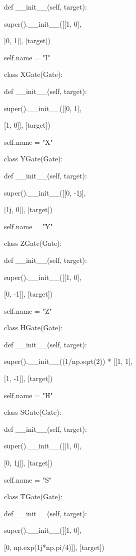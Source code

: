\documentclass[%
oneside,                 %
final,                   %
10pt]{article}
\begin{document}
    def __init__(self, target):

        super().__init__([[1, 0],

                          [0, 1]], [target])

        self.name = "I"



class XGate(Gate):

    def __init__(self, target):

        super().__init__([[0, 1],

                          [1, 0]], [target])

        self.name = "X"



class YGate(Gate):

    def __init__(self, target):

        super().__init__([[0, -1j],

                          [1j, 0]], [target])

        self.name = "Y"



class ZGate(Gate):

    def __init__(self, target):

        super().__init__([[1, 0],

                          [0, -1]], [target])

        self.name = "Z"



class HGate(Gate):

    def __init__(self, target):

        super().__init__((1/np.sqrt(2)) * [[1, 1],

                                           [1, -1]], [target])

        self.name = "H"



class SGate(Gate):

    def __init__(self, target):

        super().__init__([[1, 0],

                          [0, 1j]], [target])

        self.name = "S"



class TGate(Gate):

    def __init__(self, target):

        super().__init__([[1, 0],

                          [0, np.exp(1j*np.pi/4)]], [target])
\end{document}
